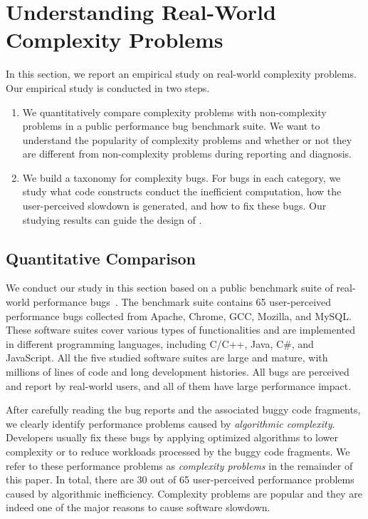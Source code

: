\section{Understanding Real-World Complexity Problems}
\label{sec:study}



In this section, we report an empirical study on real-world 
complexity problems. Our empirical study is conducted in two steps.

\begin{enumerate}


\item 
We quantitatively compare complexity problems with non-complexity problems
in a public performance bug benchmark suite. 
We want to understand the popularity of complexity problems 
and whether or not they are different from non-complexity 
problems during reporting and diagnosis. 

\item We build a taxonomy for complexity bugs. 
For bugs in each category, 
we study what code constructs conduct the inefficient computation,
how the user-perceived slowdown is generated, 
and how to fix these bugs. 
Our studying results can guide the design of \Tool.

\end{enumerate}



\subsection{Quantitative Comparison}
\label{sec:compare}

We conduct our study in this section based on a public benchmark 
suite of real-world performance bugs~\cite{PerfBug,SongOOPSLA2014,ldoctor}.
The benchmark suite contains 65 user-perceived performance bugs 
collected from  Apache, Chrome, GCC, Mozilla, and MySQL. 
These software suites cover various types of functionalities and are implemented 
in different programming languages, including C/C++, Java, C\#, and JavaScript. 
All the five studied software suites are large and mature, 
with millions of lines of code and long development histories. 
All bugs are perceived and report by real-world users, and all of them 
have large performance impact. 

After carefully reading the bug reports and the associated buggy code fragments,
we clearly identify \ComBugs performance problems 
caused by {\textit{algorithmic complexity}}.
Developers usually fix these bugs by applying optimized algorithms to lower complexity
or to reduce workloads processed by the buggy code fragments. 
We refer to these performance problems as 
{\textit{complexity problems}} in the remainder of this paper.
In total, there are 30 out of 65 user-perceived performance problems 
caused by algorithmic inefficiency. 
Complexity problems are popular and 
they are indeed one of the major reasons to cause software slowdown.


